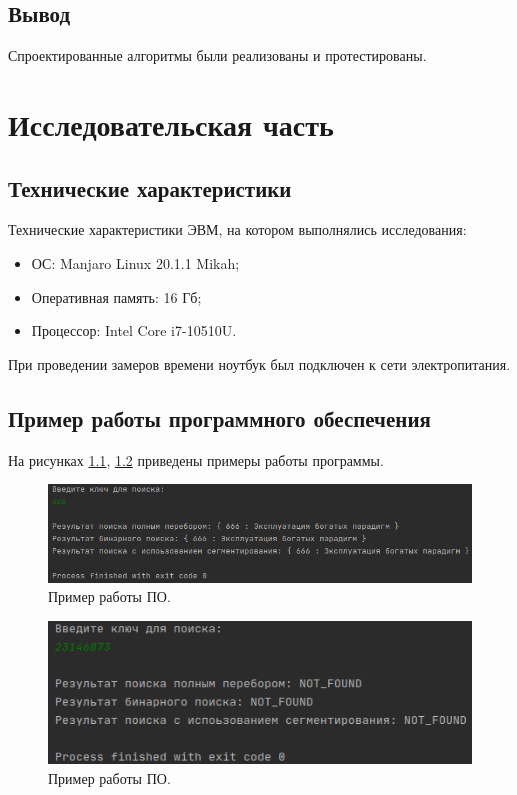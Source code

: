 \documentclass[12pt]{report}
\begin{document}
\section*{Вывод}
Спроектированные алгоритмы были реализованы и протестированы.

\chapter{Исследовательская часть}
\section{Технические характеристики}
Технические характеристики ЭВМ, на котором выполнялись исследования:
\begin{itemize}
\item ОС: Manjaro Linux 20.1.1 Mikah;
\item Оперативная память: 16 Гб;
\item Процессор: Intel Core i7-10510U.
\end{itemize}

При проведении замеров времени ноутбук был подключен к сети электропитания.

\section{Пример работы программного обеспечения}
На рисунках \ref{img:example1}, \ref{img:example2} приведены примеры работы программы.

\begin{figure}[!ht]
\begin{center}
\includegraphics[scale=0.7]{inc/img/example1.png}
\captionsetup{justification=centering}
	\caption{Пример работы ПО.}
	\label{img:example1}	
\end{center}
\end{figure}

\begin{figure}[!ht]
\begin{center}
\includegraphics[scale=1.1]{inc/img/example2.png}
\captionsetup{justification=centering}
	\caption{Пример работы ПО.}
	\label{img:example2}	
\end{center}
\end{figure}
\end{document}

